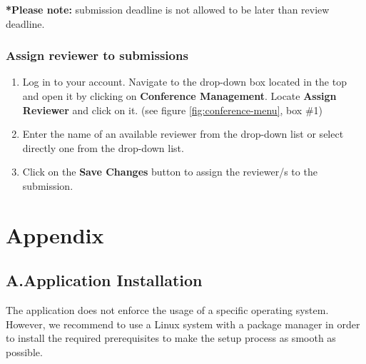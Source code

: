 \documentclass[nochapterpage,nopartpage,noheadingspace,numbersubsubsec,bigchapter,colorback,accentcolor=tud9c,10pt]{tudreport}
\begin{document}

\textbf{*Please note:} submission deadline is not allowed to be later than review deadline.

	\section{Assign reviewer to submissions}

\begin{enumerate}
	\item	Log in to your account. Navigate to the drop-down box located in the top and open it by clicking on \textbf{Conference Management}. Locate \textbf{Assign Reviewer} and click on it. (see figure \ref{fig:conference-menu}, box \#1)
	\item	Enter the name of an available reviewer from the drop-down list or select directly one from the drop-down list.
	\item	Click on the \textbf{Save Changes} button to assign the reviewer/s to the submission.
\end{enumerate}


\part{Appendix}
\label{part:appendix}

  \chapter*{A.\quad Application Installation}
  \label{ch:appendix:setup}

    The application does not enforce the usage of a specific operating system. However, we recommend to use a Linux system with a package manager in order to install the required prerequisites to make the setup process as smooth as possible.
\end{document}

